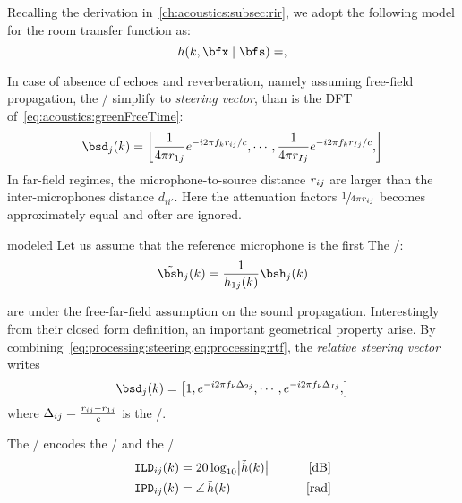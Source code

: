 Recalling the derivation in~\cref{ch:acoustics:subsec:rir}, we adopt the following model for the room transfer function as:
\begin{equation}
    \rir (k, \positionMicrophone \mid \positionSource) =
    ,
\end{equation}

In case of absence of echoes and reverberation, namely assuming free-field propagation,
the \RIRs/ simplify to \textit{steering vector}, than is the DFT of~\cref{eq:acoustics:greenFreeTime}:
\begin{equation}\label{eq:processing:steering}
    \bsd_{j}(k) = \klist{\frac{1}{4 \pi \distMicSrc_{1j}} \cste^{-\csti 2 \pi f_k \distMicSrc_{ij} / c},
                            \cdots,
                            \frac{1}{4 \pi \distMicSrc_{Ij}} \cste^{-\csti 2 \pi f_k \distMicSrc_{Ij} / c},
                    }
\end{equation}
In far-field regimes, the microphone-to-source distance $r_{ij}$ are larger than the
inter-microphones distance $d_{ii'}$. Here the attenuation factors $\sfrac{1}{4 \pi r_{ij}}$ becomes approximately equal
and ofter are ignored.


 modeled
Let us assume that the reference microphone is the first
The \RTFdef/:
\begin{equation}\label{eq:processing:rtf}
    \rtfs_j(k) = \frac{1}{\rir_{1j}(k)} \rirs_j(k)
\end{equation}

 are under the free-far-field assumption on the sound propagation.
Interestingly from their closed form definition, an important geometrical property arise.
By combining~\cref{eq:processing:steering,eq:processing:rtf}, the \textit{relative steering vector} writes
\begin{equation}
    \bsd_{j}(k) = \klist{1,
                         \cste^{-\csti 2 \pi f_k \deltaTaus_{2j}},
                         \cdots,
                         \cste^{-\csti 2 \pi f_k \deltaTaus_{Ij}},
                    }
\end{equation}
where $\Delta_{ij} = \frac{r_{ij}-r_{1j}}{c}$ is the \TDOAdef/.

The \RTFs/ encodes the \ILDdef/ and the \IPDdef/
\begin{align}
    \ild_{ij}(k) &= 20 \log_{10} \magnitudeOf{\rtf(k)} \mathspace & [\si{\dB}]\\
    \ipd_{ij}(k) &= \phaseOf{\rtf(k)} \mathspace                  & [\si{\radian}]
\end{align}

